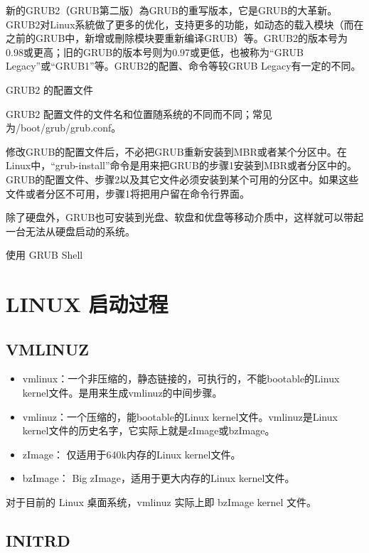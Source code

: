 \documentclass[doctor,openright,twoside]{sjtuthesis}
\providecommand{\tightlist}{%
    \setlength{\itemsep}{0pt}\setlength{\parskip}{0pt}}
\theoremstyle{plain}
\theoremstyle{definition}
\theoremstyle{remark}
\theoremstyle{ocrenumbox}
\theoremstyle{plain}
\begin{document}
新的GRUB2（GRUB第二版）為GRUB的重写版本，它是GRUB的大革新。GRUB2对Linux系統做了更多的优化，支持更多的功能，如动态的载入模块（而在之前的GRUB中，新增或刪除模块要重新编译GRUB）等。GRUB2的版本号为0.98或更高；旧的GRUB的版本号则为0.97或更低，也被称为``GRUB
Legacy''或``GRUB1''等。GRUB2的配置、命令等较GRUB Legacy有一定的不同。

GRUB2 的配置文件

GRUB2
配置文件的文件名和位置随系统的不同而不同；常见为/boot/grub/grub.conf。

修改GRUB的配置文件后，不必把GRUB重新安装到MBR或者某个分区中。在Linux中，``grub-install''命令是用来把GRUB的步骤1安装到MBR或者分区中的。GRUB的配置文件、步骤2以及其它文件必须安装到某个可用的分区中。如果这些文件或者分区不可用，步骤1将把用户留在命令行界面。

除了硬盘外，GRUB也可安装到光盘、软盘和优盘等移动介质中，这样就可以带起一台无法从硬盘启动的系统。

使用 GRUB Shell

\hypertarget{linux-}{%
\section{LINUX 启动过程}\label{linux-}}

\hypertarget{vmlinuz}{%
\subsection{VMLINUZ}\label{vmlinuz}}

\begin{itemize}
\tightlist
\item
  vmlinux：一个非压缩的，静态链接的，可执行的，不能bootable的Linux
  kernel文件。是用来生成vmlinuz的中间步骤。
\item
  vmlinuz：一个压缩的，能bootable的Linux kernel文件。vmlinuz是Linux
  kernel文件的历史名字，它实际上就是zImage或bzImage。
\item
  zImage： 仅适用于640k内存的Linux kernel文件。
\item
  bzImage： Big zImage，适用于更大内存的Linux kernel文件。
\end{itemize}

对于目前的 Linux 桌面系统，vmlinuz 实际上即 bzImage kernel 文件。

\hypertarget{initrd}{%
\subsection{INITRD}\label{initrd}}
\end{document}
